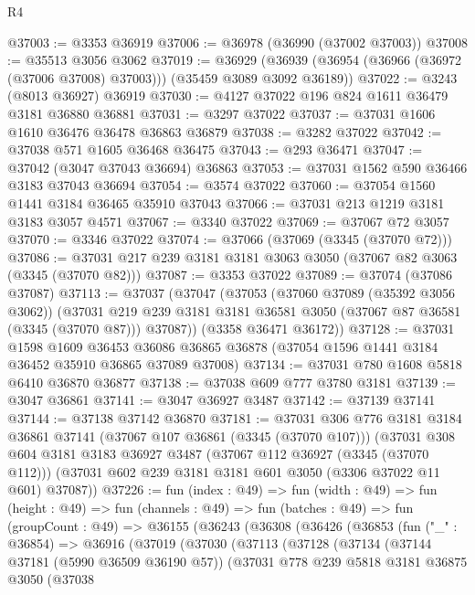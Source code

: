 \begin{lexlean}{R4}
\begin{coremodule}
@37003 := @3353 @36919
@37006 := @36978 (@36990 (@37002 @37003))
@37008 := @35513 @3056 @3062
@37019 := @36929
    (@36939 (@36954 (@36966 (@36972 (@37006 @37008) @37003))) (@35459 @3089 @3092 @36189))
@37022 := @3243 (@8013 @36927) @36919
@37030 := @4127 @37022 @196 @824 @1611 @36479 @3181 @36880 @36881
@37031 := @3297 @37022
@37037 := @37031 @1606 @1610 @36476 @36478 @36863 @36879
@37038 := @3282 @37022
@37042 := @37038 @571 @1605 @36468 @36475
@37043 := @293 @36471
@37047 := @37042 (@3047 @37043 @36694) @36863
@37053 := @37031 @1562 @590 @36466 @3183 @37043 @36694
@37054 := @3574 @37022
@37060 := @37054 @1560 @1441 @3184 @36465 @35910 @37043
@37066 := @37031 @213 @1219 @3181 @3183 @3057 @4571
@37067 := @3340 @37022
@37069 := @37067 @72 @3057
@37070 := @3346 @37022
@37074 := @37066 (@37069 (@3345 (@37070 @72)))
@37086 := @37031 @217 @239 @3181 @3181 @3063 @3050 (@37067 @82 @3063 (@3345 (@37070 @82)))
@37087 := @3353 @37022
@37089 := @37074 (@37086 @37087)
@37113 := @37037
    (@37047
      (@37053
        (@37060 @37089 (@35392 @3056 @3062))
        (@37031 @219 @239 @3181 @3181 @36581 @3050 (@37067 @87 @36581 (@3345 (@37070 @87))) @37087))
      (@3358 @36471 @36172))
@37128 := @37031
    @1598
    @1609
    @36453
    @36086
    @36865
    @36878
    (@37054 @1596 @1441 @3184 @36452 @35910 @36865 @37089 @37008)
@37134 := @37031 @780 @1608 @5818 @6410 @36870 @36877
@37138 := @37038 @609 @777 @3780 @3181
@37139 := @3047 @36861
@37141 := @3047 @36927 @3487
@37142 := @37139 @37141
@37144 := @37138 @37142 @36870
@37181 := @37031
    @306
    @776
    @3181
    @3184
    @36861
    @37141
    (@37067 @107 @36861 (@3345 (@37070 @107)))
    (@37031
      @308
      @604
      @3181
      @3183
      @36927
      @3487
      (@37067 @112 @36927 (@3345 (@37070 @112)))
      (@37031 @602 @239 @3181 @3181 @601 @3050 (@3306 @37022 @11 @601) @37087))
@37226 := fun (index : @49) =>
  fun (width : @49) =>
  fun (height : @49) =>
  fun (channels : @49) =>
  fun (batches : @49) =>
  fun (groupCount : @49) =>
  @36155
    (@36243
      (@36308
        (@36426
          (@36853
            (fun ("_" : @36854) =>
            @36916
              (@37019
                (@37030
                  (@37113
                    (@37128
                      (@37134
                        (@37144 @37181 (@5990 @36509 @36190 @57))
                        (@37031
                          @778
                          @239
                          @5818
                          @3181
                          @36875
                          @3050
                          (@37038

\end{coremodule}
\end{lexlean}
